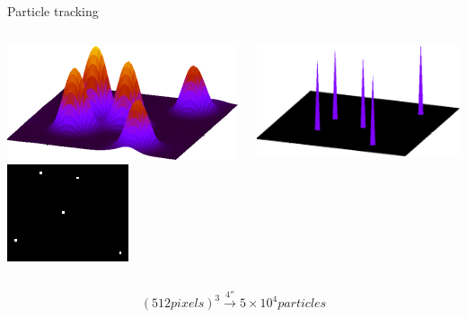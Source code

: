 \begin{frame}{Particle tracking}
\begin{columns}[T]
	\bigskip
	\includegraphics[width=\textwidth]{dillute_filtered_gp_raster}
	\includegraphics[width=\textwidth]{dillute_centers}
	
	\bigskip
	\includegraphics[width=\textwidth]{dillute_centers_gp_raster}
	\end{columns}
	
	\bigskip
	\[ (\unit{512}{pixels})^3 \xrightarrow{\unit{4}{\second}} \unit{5\times 10^4}{particles} \]
\end{frame}

